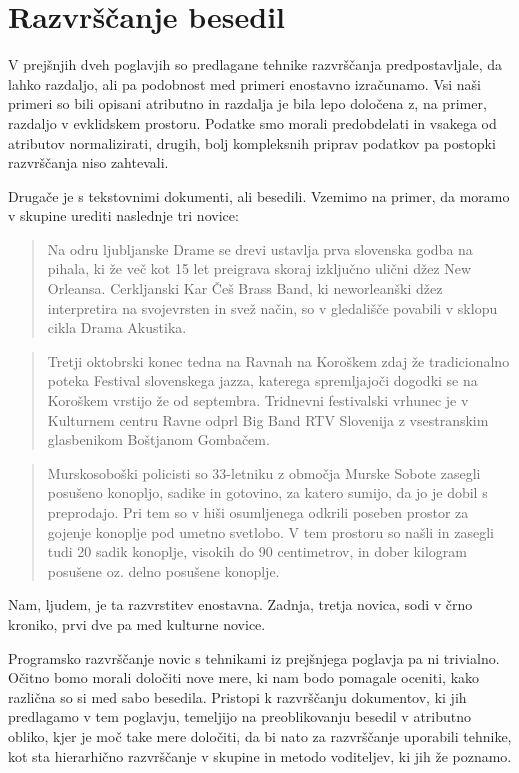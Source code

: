 \chapter{Razvrščanje besedil}

V prejšnjih dveh poglavjih so predlagane tehnike razvrščanja
predpostavljale, da lahko razdaljo, ali pa podobnost med primeri
enostavno izračunamo. Vsi naši primeri so bili opisani atributno in
razdalja je bila lepo določena z, na primer, razdaljo v evklidskem
prostoru. Podatke smo morali predobdelati in vsakega od
atributov normalizirati, drugih, bolj kompleksnih priprav podatkov pa
postopki razvrščanja niso zahtevali.

Drugače je s tekstovnimi dokumenti, ali besedili. Vzemimo na
primer, da moramo v skupine urediti naslednje tri novice:

{\small
\begin{quotation}
Na odru ljubljanske Drame se drevi ustavlja prva slovenska godba na pihala, ki že več kot 15 let preigrava skoraj izključno ulični džez New Orleansa. Cerkljanski Kar Češ Brass Band, ki neworleanški džez interpretira na svojevrsten in svež način, so v gledališče povabili v sklopu cikla Drama Akustika.
\end{quotation}

\begin{quotation}
Tretji oktobrski konec tedna na Ravnah na Koroškem zdaj že tradicionalno poteka Festival slovenskega jazza, katerega spremljajoči dogodki se na Koroškem vrstijo že od septembra. Tridnevni festivalski vrhunec je v Kulturnem centru Ravne odprl Big Band RTV Slovenija z vsestranskim glasbenikom Boštjanom Gombačem.
\end{quotation}

\begin{quotation}
Murskosoboški policisti so 33-letniku z območja Murske Sobote zasegli
posušeno konopljo, sadike in gotovino, za katero sumijo, da jo je
dobil s preprodajo. Pri tem so v hiši osumljenega odkrili poseben
prostor za gojenje konoplje pod umetno svetlobo. V tem prostoru so
našli in zasegli tudi 20 sadik konoplje, visokih do 90 centimetrov, in
dober kilogram posušene oz. delno posušene konoplje.
\end{quotation}
}

Nam, ljudem, je ta razvrstitev enostavna. Zadnja, tretja novica, sodi
v črno kroniko, prvi dve pa med kulturne novice.

Programsko razvrščanje novic s tehnikami iz prejšnjega poglavja pa ni
trivialno. Očitno bomo morali določiti nove mere, ki nam bodo pomagale
oceniti, kako različna so si med sabo besedila. Pristopi k razvrščanju
dokumentov, ki jih predlagamo v tem poglavju, temeljijo na
preoblikovanju besedil v atributno obliko, kjer je moč take mere
določiti, da bi nato za razvrščanje uporabili tehnike, kot sta
hierarhično razvrščanje v skupine in metodo voditeljev, ki jih že
poznamo.

